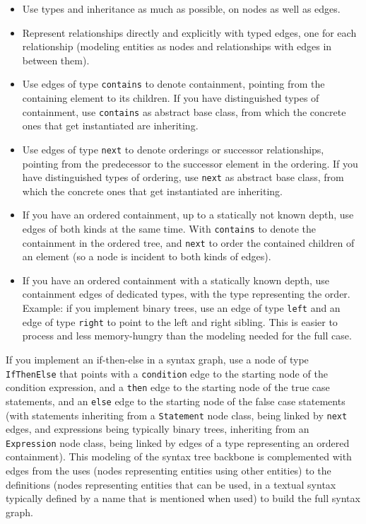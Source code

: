 \begin{itemize}
  \item Use types and inheritance as much as possible, on nodes as well as edges. 
	\item Represent relationships directly and explicitly with typed edges, one for each relationship (modeling entities as nodes and relationships with edges in between them).
	\item Use edges of type \texttt{contains} to denote containment, pointing from the containing element to its children. If you have distinguished types of containment, use \texttt{contains} as abstract base class, from which the concrete ones that get instantiated are inheriting.
	\item Use edges of type \texttt{next} to denote orderings or successor relationships, pointing from the predecessor to the successor element in the ordering. If you have distinguished types of ordering, use \texttt{next} as abstract base class, from which the concrete ones that get instantiated are inheriting.
	\item If you have an ordered containment, up to a statically not known depth, use edges of both kinds at the same time. With \texttt{contains} to denote the containment in the ordered tree, and \texttt{next} to order the contained children of an element (so a node is incident to both kinds of edges).
	\item If you have an ordered containment with a statically known depth, use containment edges of dedicated types, with the type representing the order. Example: if you implement binary trees, use an edge of type \texttt{left} and an edge of type \texttt{right} to point to the left and right sibling. This is easier to process and less memory-hungry than the modeling needed for the full case.
\end{itemize}

\begin{note}
If you implement an if-then-else in a syntax graph, use a node of type \texttt{IfThenElse} that points with a \texttt{condition} edge to the starting node of the condition expression, and a \texttt{then} edge to the starting node of the true case statements, and an \texttt{else} edge to the starting node of the false case statements (with statements inheriting from a \texttt{Statement} node class, being linked by \texttt{next} edges, and expressions being typically binary trees, inheriting from an \texttt{Expression} node class, being linked by edges of a type representing an ordered containment). This modeling of the syntax tree backbone is complemented with edges from the uses (nodes representing entities using other entities) to the definitions (nodes representing entities that can be used, in a textual syntax typically defined by a name that is mentioned when used) to build the full syntax graph.
\end{note}

